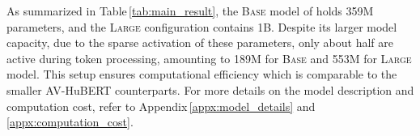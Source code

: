

As summarized in Table\,\ref{tab:main_result}, the \textsc{Base} model of \ourmodel holds 359M parameters, and the \textsc{Large} configuration contains 1B. Despite its larger model capacity, due to the sparse activation of these parameters, only about half are active during token processing, amounting to 189M for \textsc{Base} and 553M for \textsc{Large} model. This setup ensures computational efficiency which is comparable to the smaller AV-HuBERT counterparts. For more details on the model description and computation cost, refer to Appendix\,\ref{appx:model_details} and \ref{appx:computation_cost}.
